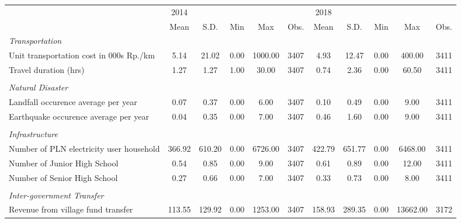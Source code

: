 \begin{tabular}{l*{2}{ccccc}}
\toprule
                &     2014&         &         &         &         &     2018&         &         &         &         \\
                &     Mean&     S.D.&      Min&      Max&     Obs.&     Mean&     S.D.&      Min&      Max&     Obs.\\
\midrule
\emph{Transportation}&         &         &         &         &         &         &         &         &         &         \\
\hspace{0.25cm} Unit transportation cost in 000s Rp./km&     5.14&    21.02&     0.00&  1000.00&     3407&     4.93&    12.47&     0.00&   400.00&     3411\\
\hspace{0.25cm} Travel duration (hrs)&     1.27&     1.27&     1.00&    30.00&     3407&     0.74&     2.36&     0.00&    60.50&     3411\\
\vspace{0.05em} \\ \emph{Natural Disaster}&         &         &         &         &         &         &         &         &         &         \\
\hspace{0.25cm} Landfall occurence average per year&     0.07&     0.37&     0.00&     6.00&     3407&     0.10&     0.49&     0.00&     9.00&     3411\\
\hspace{0.25cm} Earthquake occurence average per year&     0.04&     0.35&     0.00&     7.00&     3407&     0.46&     1.60&     0.00&     9.00&     3411\\
\vspace{0.05em} \\ \emph{Infrastructure}&         &         &         &         &         &         &         &         &         &         \\
\hspace{0.25cm} Number of PLN electricity user household&   366.92&   610.20&     0.00&  6726.00&     3407&   422.79&   651.77&     0.00&  6468.00&     3411\\
\hspace{0.25cm} Number of Junior High School&     0.54&     0.85&     0.00&     9.00&     3407&     0.61&     0.89&     0.00&    12.00&     3411\\
\hspace{0.25cm} Number of Senior High School&     0.27&     0.66&     0.00&     7.00&     3407&     0.33&     0.73&     0.00&     8.00&     3411\\
\vspace{0.05em} \\ \emph{Inter-government Transfer}&         &         &         &         &         &         &         &         &         &         \\
\hspace{0.25cm} Revenue from village fund transfer&   113.55&   129.92&     0.00&  1253.00&     3407&   158.93&   289.35&     0.00& 13662.00&     3172\\
\bottomrule
\end{tabular}
